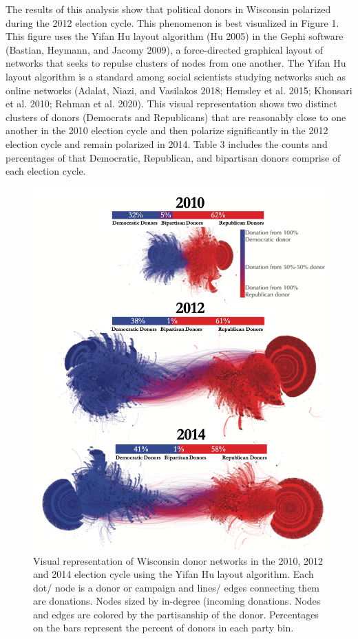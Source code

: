 \documentclass[12pt,]{article}
\begin{document}
The results of this analysis show that political donors in Wisconsin
polarized during the 2012 election cycle. This phenomenon is best
visualized in Figure 1. This figure uses the Yifan Hu layout algorithm
(Hu 2005) in the Gephi software (Bastian, Heymann, and Jacomy 2009), a
force-directed graphical layout of networks that seeks to repulse
clusters of nodes from one another. The Yifan Hu layout algorithm is a
standard among social scientists studying networks such as online
networks (Adalat, Niazi, and Vasilakos 2018; Hemsley et al. 2015;
Khonsari et al. 2010; Rehman et al. 2020). This visual representation
shows two distinct clusters of donors (Democrats and Republicans) that
are reasonably close to one another in the 2010 election cycle and then
polarize significantly in the 2012 election cycle and remain polarized
in 2014. Table 3 includes the counts and percentages of that Democratic,
Republican, and bipartisan donors comprise of each election cycle.

\begin{figure}

{\centering \includegraphics[width=0.73\linewidth]{../figures/fig1} 

}

\caption{Visual representation of Wisconsin donor networks in the 2010, 2012 and 2014 election cycle using the Yifan Hu layout algorithm. Each dot/ node is a donor or campaign and lines/ edges connecting them are donations. Nodes sized by in-degree (incoming donations. Nodes and edges are colored by the partisanship of the donor. Percentages on the bars represent the percent of donors in each party bin.}\label{fig:unnamed-chunk-10}
\end{figure}
\end{document}
